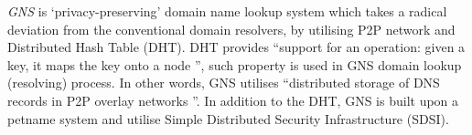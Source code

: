 \textit{GNS} \cite{grothoff2017nsa, wachs2014censorship} is `privacy-preserving' domain name lookup system which takes a radical deviation from the conventional domain resolvers, by utilising P2P network and Distributed Hash Table (DHT).
DHT provides ``support for an operation: given a key, it maps the key onto a node \cite{stoica2001chord}'', such property is used in GNS domain lookup (resolving) process. 
In other words, GNS utilises ``distributed storage of DNS records in P2P overlay networks \cite{wachs2014censorship}''. In addition to the DHT, GNS is built upon a petname system \cite{stiegler2005introduction} and utilise Simple Distributed Security Infrastructure (SDSI).